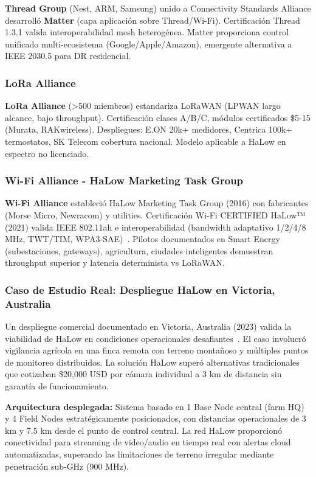\textbf{Thread Group} (Nest, ARM, Samsung) unido a Connectivity Standards Alliance desarrolló \textbf{Matter} (capa aplicación sobre Thread/Wi-Fi). Certificación Thread 1.3.1 valida interoperabilidad mesh heterogénea. Matter proporciona control unificado multi-ecosistema (Google/Apple/Amazon), emergente alternativa a IEEE 2030.5 para DR residencial.

\subsubsection{LoRa Alliance}

\textbf{LoRa Alliance} (>500 miembros) estandariza LoRaWAN (LPWAN largo alcance, bajo throughput). Certificación clases A/B/C, módulos certificados \$5-15 (Murata, RAKwireless). Despliegues: E.ON 20k+ medidores, Centrica 100k+ termostatos, SK Telecom cobertura nacional. Modelo aplicable a HaLow en espectro no licenciado.

\subsubsection{Wi-Fi Alliance - HaLow Marketing Task Group}

\textbf{Wi-Fi Alliance} estableció HaLow Marketing Task Group (2016) con fabricantes (Morse Micro, Newracom) y utilities. Certificación Wi-Fi CERTIFIED HaLow™ (2021) valida IEEE 802.11ah e interoperabilidad (bandwidth adaptativo 1/2/4/8 MHz, TWT/TIM, WPA3-SAE)~\cite{ahmedMACProtocolsIEEE2022}. Pilotos documentados en Smart Energy (subestaciones, gateways), agricultura, ciudades inteligentes demuestran throughput superior y latencia determinista vs LoRaWAN.

\subsubsection{Caso de Estudio Real: Despliegue HaLow en Victoria, Australia}

Un despliegue comercial documentado en Victoria, Australia (2023) valida la viabilidad de HaLow en condiciones operacionales desafiantes~\cite{halownetworkPreventingLivestockTheft2023}. El caso involucró vigilancia agrícola en una finca remota con terreno montañoso y múltiples puntos de monitoreo distribuidos. La solución HaLow superó alternativas tradicionales que cotizaban \$20,000 USD por cámara individual a 3 km de distancia sin garantía de funcionamiento.

\textbf{Arquitectura desplegada:} Sistema basado en 1 Base Node central (farm HQ) y 4 Field Nodes estratégicamente posicionados, con distancias operacionales de 3 km y 7.5 km desde el punto de control central. La red HaLow proporcionó conectividad para streaming de video/audio en tiempo real con alertas cloud automatizadas, superando las limitaciones de terreno irregular mediante penetración sub-GHz (900 MHz).

